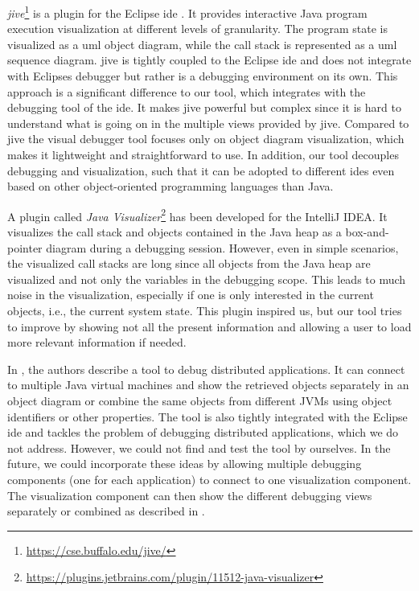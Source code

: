 \documentclass[conference]{IEEEtran}
\newcommand{\intellij}{IntelliJ IDEA}
\begin{document}
\textit{\gls*{jive}}\footnote{\url{https://cse.buffalo.edu/jive/}} is a plugin for the Eclipse \gls*{ide} \cite{czyzDeclarativeVisualDebugging2007,k.p.FiniteStateModel2021}.
It provides interactive Java program execution visualization at different levels of granularity.
The program state is visualized as a \gls*{uml} object diagram, while the call stack is represented as a \gls*{uml} sequence diagram.
\gls*{jive} is tightly coupled to the Eclipse \gls*{ide} and does not integrate with Eclipses debugger but rather is a debugging environment on its own.
This approach is a significant difference to our tool, which integrates with the debugging tool of the \gls*{ide}.
It makes \gls*{jive} powerful but complex since it is hard to understand what is going on in the multiple views provided by \gls*{jive}.
Compared to \gls*{jive} the visual debugger tool focuses only on object diagram visualization, which makes it lightweight and straightforward to use.
In addition, our tool decouples debugging and visualization, such that it can be adopted to different \glspl*{ide} even based on other object-oriented programming languages than Java.

A plugin called \textit{Java Visualizer}\footnote{\url{https://plugins.jetbrains.com/plugin/11512-java-visualizer}} has been developed for the \intellij{}.
It visualizes the call stack and objects contained in the Java heap as a box-and-pointer diagram during a debugging session.
However, even in simple scenarios, the visualized call stacks are long since all objects from the Java heap are visualized and not only the variables in the debugging scope.
This leads to much noise in the visualization, especially if one is only interested in the current objects, i.e., the current system state.
This plugin inspired us, but our tool tries to improve by showing not all the present information and allowing a user to load more relevant information if needed.

In \cite{kochGraphicalDebuggingDistributed2015}, the authors describe a tool to debug distributed applications.
It can connect to multiple Java virtual machines and show the retrieved objects separately in an object diagram or combine the same objects from different JVMs using object identifiers or other properties.
The tool is also tightly integrated with the Eclipse \gls*{ide} and tackles the problem of debugging distributed applications, which we do not address.
However, we could not find and test the tool by ourselves.
In the future, we could incorporate these ideas by allowing multiple debugging components (one for each application) to connect to one visualization component.
The visualization component can then show the different debugging views separately or combined as described in \cite{kochGraphicalDebuggingDistributed2015}.
\end{document}

